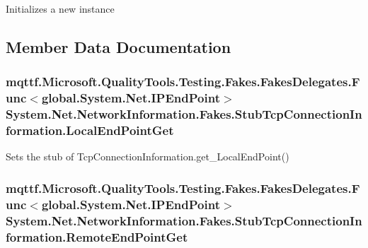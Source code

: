 Initializes a new instance



\subsection{Member Data Documentation}
\hypertarget{class_system_1_1_net_1_1_network_information_1_1_fakes_1_1_stub_tcp_connection_information_aacc1ae64e1055223910e0f48780cfaac}{
\subsubsection[{Local\-End\-Point\-Get}]{\setlength{\rightskip}{0pt plus 5cm}mqttf.\-Microsoft.\-Quality\-Tools.\-Testing.\-Fakes.\-Fakes\-Delegates.\-Func$<$global.\-System.\-Net.\-I\-P\-End\-Point$>$ System.\-Net.\-Network\-Information.\-Fakes.\-Stub\-Tcp\-Connection\-Information.\-Local\-End\-Point\-Get}}\label{class_system_1_1_net_1_1_network_information_1_1_fakes_1_1_stub_tcp_connection_information_aacc1ae64e1055223910e0f48780cfaac}


Sets the stub of Tcp\-Connection\-Information.\-get\-\_\-\-Local\-End\-Point()

\hypertarget{class_system_1_1_net_1_1_network_information_1_1_fakes_1_1_stub_tcp_connection_information_a00b0d4e5ff1638bf3fde8c4979b69d50}{
\subsubsection[{Remote\-End\-Point\-Get}]{\setlength{\rightskip}{0pt plus 5cm}mqttf.\-Microsoft.\-Quality\-Tools.\-Testing.\-Fakes.\-Fakes\-Delegates.\-Func$<$global.\-System.\-Net.\-I\-P\-End\-Point$>$ System.\-Net.\-Network\-Information.\-Fakes.\-Stub\-Tcp\-Connection\-Information.\-Remote\-End\-Point\-Get}}\label{class_system_1_1_net_1_1_network_information_1_1_fakes_1_1_stub_tcp_connection_information_a00b0d4e5ff1638bf3fde8c4979b69d50}


